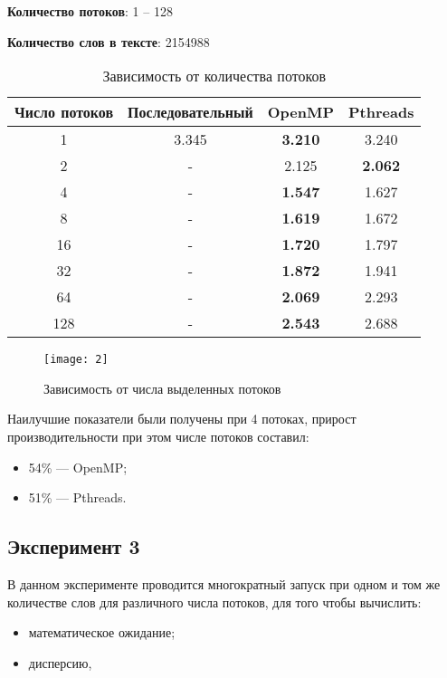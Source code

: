 \textbf{Количество потоков}: 1 -- 128

\textbf{Количество слов в тексте}: 2154988

\begin{table}[H]
	\centering
	\begin{tabular}{|c|c|c|c|}
		\hline
		Число потоков & Последовательный & OpenMP & Pthreads \\ \hline
		1   & 3.345            & \textbf{3.210}   & 3.240     \\ \hline
		2   & -                & 2.125  & \textbf{2.062}    \\ \hline
		4   & -                & \textbf{1.547}  & 1.627    \\ \hline
		8   & -                & \textbf{1.619}  & 1.672    \\ \hline
		16  & -                & \textbf{1.720}   & 1.797    \\ \hline
		32  & -                & \textbf{1.872}  & 1.941    \\ \hline
		64  & -                & \textbf{2.069}  & 2.293    \\ \hline
		128 & -                & \textbf{2.543}  & 2.688    \\
		\hline
	\end{tabular}
	\caption{Зависимость от количества потоков}
	\label{tab:threadchange}
\end{table}

\begin{figure}[H]
	\centering
	\texttt{[image: 2]}
	\caption{Зависимость от числа выделенных потоков}
	\label{pic:threadchange}
\end{figure}

Наилучшие показатели были получены при 4 потоках, прирост производительности при этом числе потоков составил:
\begin{itemize}
\item 54\% --- OpenMP;
\item 51\% --- Pthreads.
\end{itemize}

\subsection{Эксперимент 3}

В данном эксперименте проводится многократный запуск при одном и том же количестве слов для различного числа потоков, для того чтобы вычислить:

\begin{itemize}
	\item математическое ожидание;
	\item дисперсию,
\end{itemize}

